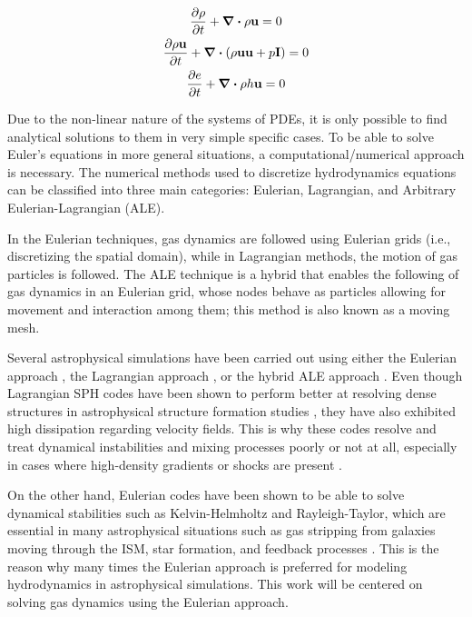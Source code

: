 \begin{subequations}\label{eq:Euler}
\begin{gather}
    \pdv{\rho}{t} + \div{\rho \vb{u}}=0\\
    \pdv{\rho\vb{u}}{t} + \div(\rho \vb{uu} +p\vb{I})=0\\
    \pdv{e}{t} + \div{\rho h\vb{u}}=0
\end{gather}
\end{subequations}

Due to the non-linear nature of the systems of PDEs, it is only possible to find analytical solutions to them in very simple specific cases. To be able to solve Euler's equations in more general situations, a computational/numerical approach is necessary. The numerical methods used to discretize hydrodynamics equations can be classified into three main categories: Eulerian, Lagrangian, and Arbitrary Eulerian-Lagrangian (ALE).

In the Eulerian techniques, gas dynamics are followed using Eulerian grids (i.e., discretizing the spatial domain), while in Lagrangian methods, the motion of gas particles is followed. The ALE technique is a hybrid that enables the following of gas dynamics in an Eulerian grid, whose nodes behave as particles allowing for movement and interaction among them; this method is also known as a moving mesh.

Several astrophysical simulations have been carried out using either the Eulerian approach \cite{Bryan2014ENZO:ASTROPHYSICS, Stone2008Athena:MHD}, the Lagrangian approach \cite{Cabezon2017SPHYNX:Applications, Springel2021SimulatingCode,Springel2010SmoothedAstrophysics}, or the hybrid ALE approach \cite{Barlow2016ArbitraryFlows, Badwaik2023ArbitraryFlows, Springel2010EMesh, Murphy2008BETHEHydro:Simulations}. Even though Lagrangian SPH codes have been shown to perform better at resolving dense structures in astrophysical structure formation studies \cite{Price2010ATurbulence, Vazza2011AStructures}, they have also exhibited high dissipation regarding velocity fields. This is why these codes resolve and treat dynamical instabilities and mixing processes poorly or not at all, especially in cases where high-density gradients  or shocks are present \cite{Agertz2007FundamentalMethods,Vazza2011AStructures}.

On the other hand, Eulerian codes have been shown to be able to solve dynamical stabilities such as Kelvin-Helmholtz and Rayleigh-Taylor, which are essential in many astrophysical situations such as gas stripping from galaxies moving through the ISM, star formation, and feedback processes \cite{Agertz2007FundamentalMethods}. This is the reason why many times the Eulerian approach is preferred for modeling hydrodynamics in astrophysical simulations. This work will be centered on solving gas dynamics using the Eulerian approach.


